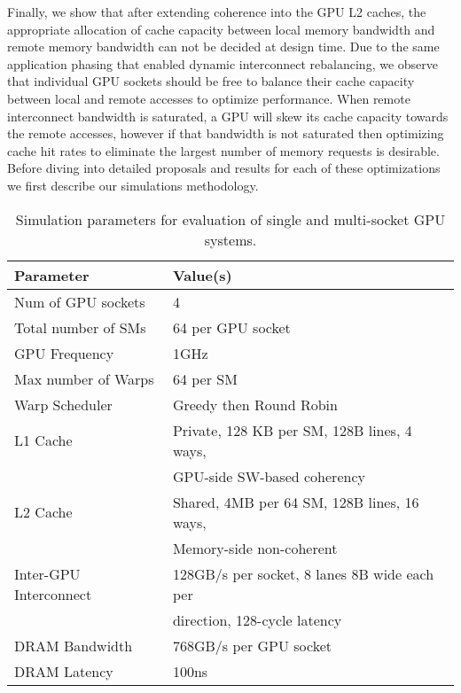 Finally, we show that after extending coherence into the GPU L2 caches, the 
appropriate allocation of cache capacity between local memory bandwidth and 
remote memory bandwidth can not be decided at design time.  Due to the same 
application phasing that enabled dynamic interconnect rebalancing, we observe 
that individual GPU sockets should be free to balance their cache capacity 
between local and remote accesses to optimize performance.  When remote 
interconnect bandwidth is saturated, a GPU will skew its cache capacity towards 
the remote accesses,  however if that bandwidth is not saturated then optimizing 
cache hit rates to eliminate the largest number of memory requests is 
desirable. Before diving into detailed proposals and results for each of these 
optimizations we first describe our simulations methodology.

\begin{table}[tp]
\begin{small}
\centering
\begin{tabular}{ll}
\toprule
\textbf{Parameter} & \textbf{Value(s)} \\
\toprule
Num of GPU sockets & 4 \\
\midrule
Total number of SMs & 64 per GPU socket \\
\midrule
GPU Frequency & 1GHz \\
\midrule
Max number of Warps & 64 per SM \\
\midrule
Warp Scheduler & Greedy then Round Robin \\
\midrule
L1 Cache & Private, 128 KB per SM, 128B lines, 4 ways, \\ & GPU-side SW-based 
coherency \\
\midrule
L2 Cache & Shared, 4MB per 64 SM, 128B lines, 16 ways, \\ & Memory-side 
non-coherent\\
\midrule
Inter-GPU Interconnect & 128GB/s per socket, 8 lanes 8B wide each per \\ & 
direction, 128-cycle latency \\
\midrule
DRAM Bandwidth & 768GB/s per GPU socket\\
\midrule
DRAM Latency & 100ns \\
\toprule
\end{tabular}
\caption{Simulation parameters for evaluation of single and multi-socket GPU 
systems.}
\label{tab:setup}
\end{small}
\end{table}

